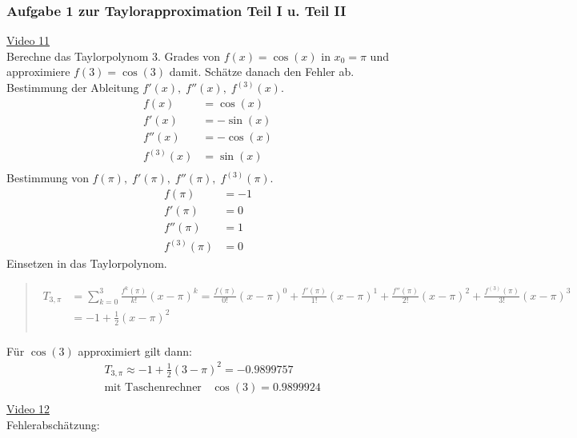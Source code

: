 \subsubsection{Aufgabe 1 zur Taylorapproximation Teil I u. Teil II}
\href{https://youtu.be/NbAlqm36CTo}{Video 11}\\
Berechne das Taylorpolynom 3. Grades von $ f(x)=\cos(x) $ in $ x_0=\pi $ und approximiere $ f(3)=\cos(3) $ damit. Schätze danach den Fehler ab.\\
\textbullet\;\; Bestimmung der Ableitung $ f'(x),\;f''(x),\;f^{(3)}(x) $.\\
\begin{align*}
f(x)&=\cos(x)\\
f'(x)&=-\sin(x)\\
f''(x)&=-\cos(x)\\
f^{(3)}(x)&=\sin(x)\\
\end{align*}
\textbullet\;\; Bestimmung von $ f(\pi),\; f'(\pi),\; f''(\pi),\; f^{(3)}(\pi) $.\\
\begin{align*}
f(\pi)&=-1\\
f'(\pi)&=0\\
f''(\pi)&=1\\
f^{(3)}(\pi)&=0
\end{align*}
\textbullet\;\; Einsetzen in das Taylorpolynom.\\
\begin{quote}
\begin{align*}
T_{3,\pi}&=\sum\limits_{k=0}^{3}\frac{f^k(\pi)}{k!}(x-\pi)^k=\frac{f(\pi)}{0!}(x-\pi)^0+\frac{f'(\pi)}{1!}(x-\pi)^1+\frac{f''(\pi)}{2!}(x-\pi)^2+\frac{f^{(3)}(\pi)}{3!}(x-\pi)^3\\
&=-1+\frac{1}{2}(x-\pi)^2\\
\end{align*}
\end{quote}
\textbullet\;\;Für $ \cos(3) $ approximiert gilt dann:\\
\begin{align*}
&T_{3,\pi}\approx-1+\frac{1}{2}(3-\pi)^2=-0.9899757\\ 
&\text{mit Taschenrechner }\;\;\cos(3)=0.9899924\\
\end{align*}
\href{https://youtu.be/sWuEka8oIQY}{Video 12}\\
\textbullet\;\;Fehlerabschätzung:\\
